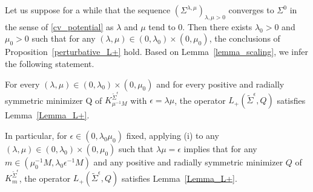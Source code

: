 Let us suppose for a while that the sequence $(\Sigma^{\lambda,\mu})_{\lambda, \mu >0}$ converges to $\Sigma^{0}$ in the sense of \eqref{cv_potential} as $\lambda$ and $\mu $ tend to 0. Then there exists $\lambda_{0}>0$ and $\mu_{0}>0$ such that for any $(\lambda,\mu)\in(0,\lambda_{0})\times(0,\mu_{0})$, the conclusions of Proposition~\ref{perturbative_L+} hold. Based on Lemma~\ref{lemma_scaling}, we
infer the following statement.

\skpt
\begin{proposition}\label{prop_scaling}
\begin{enumeratei}
\item\label{prop_scalingi}
For every $(\lambda,\mu)\in(0,\lambda_{0})\times(0,\mu_{0})$ and for every positive and radially symmetric minimizer Q of $K_{\mu^{-1}M}^{\widetilde{\Sigma}^{\epsilon}}$ with $\epsilon=\lambda\mu$, the operator $L_{+}(\widetilde{\Sigma}^{\epsilon},Q)$ satisfies Lemma~\ref{Lemma_L+}.

\item\label{prop_scalingii}
In particular, for $\epsilon\in(0,\lambda_{0}\mu_{0})$ fixed, applying (i) to any $(\lambda,\mu)\in(0,\lambda_{0})\times(0,\mu_{0})$ such that $\lambda\mu=\epsilon$
implies that for any $m\in(\mu_{0}^{-1}M,\lambda_{0}\epsilon^{-1}M)$ and any positive and radially symmetric minimizer $Q$ of $K_{m}^{\widetilde{\Sigma}^{\epsilon}}$, the operator $L_{+}(\widetilde{\Sigma}^{\epsilon},Q)$ satisfies Lemma~\ref{Lemma_L+}.
\end{enumeratei}
\end{proposition}

